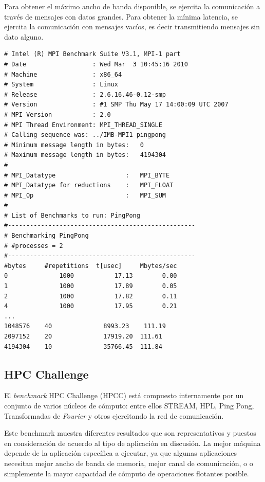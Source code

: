 \documentclass[a4paper]{report}
\begin{document}
\bigskip

Para obtener el m\'aximo ancho de banda disponible, se ejercita la comunicaci\'on a trav\'es de mensajes con datos grandes. Para obtener la m\'inima latencia, se ejercita la comunicaci\'on con mensajes vac\'ios, es decir transmitiendo mensajes sin dato alguno.

{\small
\begin{verbatim}
# Intel (R) MPI Benchmark Suite V3.1, MPI-1 part
# Date                  : Wed Mar  3 10:45:16 2010
# Machine               : x86_64
# System                : Linux
# Release               : 2.6.16.46-0.12-smp
# Version               : #1 SMP Thu May 17 14:00:09 UTC 2007
# MPI Version           : 2.0
# MPI Thread Environment: MPI_THREAD_SINGLE
# Calling sequence was: ../IMB-MPI1 pingpong
# Minimum message length in bytes:   0
# Maximum message length in bytes:   4194304
#
# MPI_Datatype                   :   MPI_BYTE
# MPI_Datatype for reductions    :   MPI_FLOAT
# MPI_Op                         :   MPI_SUM
#
# List of Benchmarks to run: PingPong
#---------------------------------------------------
# Benchmarking PingPong
# #processes = 2
#---------------------------------------------------
#bytes     #repetitions  t[usec]     Mbytes/sec
0              1000           17.13        0.00
1              1000           17.89        0.05
2              1000           17.82        0.11
4              1000           17.95        0.21
...
1048576    40              8993.23    111.19
2097152    20              17919.20  111.61
4194304    10              35766.45  111.84
\end{verbatim}
}

\subsection{HPC Challenge}

El {\it benchmark} HPC Challenge \cite{hpcc} (HPCC) est\'a compuesto internamente por un conjunto de
varios n\'ucleos de c\'omputo: entre ellos STREAM, HPL, Ping Pong, Transformadas de {\it Fourier}
y otros ejercitando la red de comunicaci\'on.

\bigskip

Este benchmark muestra diferentes resultados que son representativos
y puestos en consideraci\'on de acuerdo al tipo de aplicaci\'on en discusi\'on.
La mejor m\'aquina depende de la aplicaci\'on espec\'ifica a ejecutar, ya que algunas
aplicaciones necesitan mejor ancho de banda de memoria, mejor canal de comunicaci\'on, o
o simplemente la mayor capacidad de c\'omputo de operaciones flotantes posible.
\end{document}
